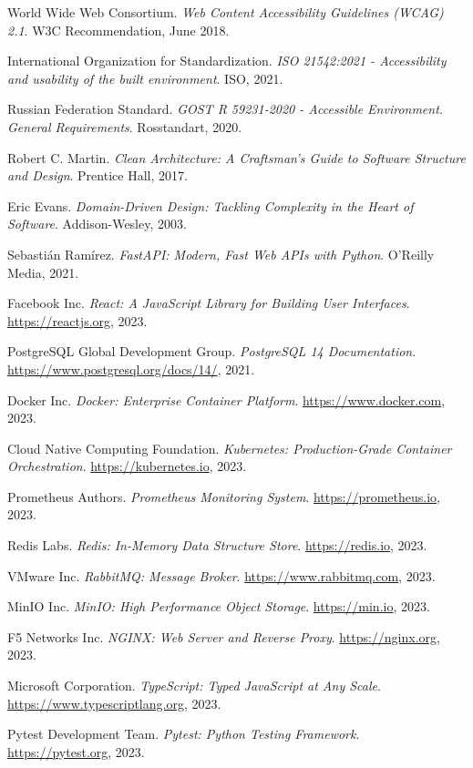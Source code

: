 \documentclass[a4paper,12pt,oneside]{book}
\begin{document}
\begin{thebibliography}{99}

World Wide Web Consortium.
\textit{Web Content Accessibility Guidelines (WCAG) 2.1}.
W3C Recommendation, June 2018.

International Organization for Standardization.
\textit{ISO 21542:2021 - Accessibility and usability of the built environment}.
ISO, 2021.

Russian Federation Standard.
\textit{GOST R 59231-2020 - Accessible Environment. General Requirements}.
Rosstandart, 2020.

Robert C. Martin.
\textit{Clean Architecture: A Craftsman's Guide to Software Structure and Design}.
Prentice Hall, 2017.

Eric Evans.
\textit{Domain-Driven Design: Tackling Complexity in the Heart of Software}.
Addison-Wesley, 2003.

Sebastián Ramírez.
\textit{FastAPI: Modern, Fast Web APIs with Python}.
O'Reilly Media, 2021.

Facebook Inc.
\textit{React: A JavaScript Library for Building User Interfaces}.
\url{https://reactjs.org}, 2023.

PostgreSQL Global Development Group.
\textit{PostgreSQL 14 Documentation}.
\url{https://www.postgresql.org/docs/14/}, 2021.

Docker Inc.
\textit{Docker: Enterprise Container Platform}.
\url{https://www.docker.com}, 2023.

Cloud Native Computing Foundation.
\textit{Kubernetes: Production-Grade Container Orchestration}.
\url{https://kubernetes.io}, 2023.

Prometheus Authors.
\textit{Prometheus Monitoring System}.
\url{https://prometheus.io}, 2023.

Redis Labs.
\textit{Redis: In-Memory Data Structure Store}.
\url{https://redis.io}, 2023.

VMware Inc.
\textit{RabbitMQ: Message Broker}.
\url{https://www.rabbitmq.com}, 2023.

MinIO Inc.
\textit{MinIO: High Performance Object Storage}.
\url{https://min.io}, 2023.

F5 Networks Inc.
\textit{NGINX: Web Server and Reverse Proxy}.
\url{https://nginx.org}, 2023.

Microsoft Corporation.
\textit{TypeScript: Typed JavaScript at Any Scale}.
\url{https://www.typescriptlang.org}, 2023.

Pytest Development Team.
\textit{Pytest: Python Testing Framework}.
\url{https://pytest.org}, 2023.

\end{thebibliography}
\end{document}
